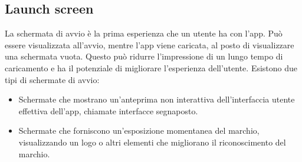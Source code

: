 \documentclass[12pt, a4paper]{report}
\begin{document}
	\subsection{Launch screen}
	La schermata di avvio è la prima esperienza che un utente ha con l’app. Può essere visualizzata all'avvio, mentre l’app viene caricata, al posto di visualizzare una schermata vuota. Questo può ridurre
	l’impressione di un lungo tempo di caricamento e ha il potenziale di migliorare l'esperienza dell'utente. Esistono due tipi di schermate di avvio:
	\begin{itemize}
		\item Schermate che mostrano un'anteprima non interattiva dell'interfaccia utente effettiva dell'app, chiamate interfacce segnaposto.
		\item Schermate che forniscono un'esposizione momentanea del marchio, visualizzando un logo o altri elementi che migliorano il riconoscimento del marchio.
	\end{itemize}
\end{document}
